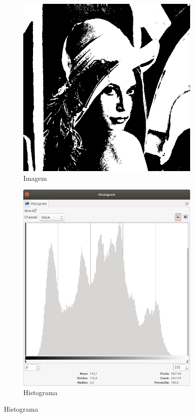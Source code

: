 \begin{figure}[!h]
    \def\figw{0.45\textwidth}
    \centering
        \begin{subfigure}{\figw}
            \centering
            \includegraphics[scale=\scalei]{images/03/lena_thresh.png}
            \caption{\label{fig:lena_thresh:hist} Imagem}
        \end{subfigure}
        \begin{subfigure}{\figw}
            \centering
            \includegraphics[scale=\scaleh]{images/03/hist_lena_thresh.png}
            \caption{\label{fig:lena_thresh:hist} Histograma}
        \end{subfigure}


\end{figure}
